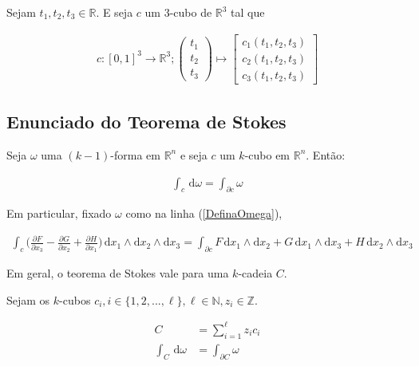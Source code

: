 \documentclass[12pt,a4paper]{article}
\begin{document}
		Sejam $t_1, t_2, t_3 \in \mathbb{R}$. E seja $c$ um 3-cubo de $\mathbb{R}^3$ tal que

		\begin{align}
			c : [0,1]^3 \rightarrow \mathbb{R}^3 ;  \begin{pmatrix} t_1 \\ t_2 \\ t_3 \end{pmatrix} \mapsto \begin{bmatrix} c_1(t_1, t_2, t_3) \\ c_2(t_1, t_2, t_3) \\ c_3(t_1, t_2, t_3) \end{bmatrix}
		\end{align}
		
	\subsection{Enunciado do Teorema de Stokes}		
		\begin{flushright}
		\end{flushright}
		
		Seja $\omega$ uma $(k-1)$-forma em $\mathbb{R}^n$ e seja $c$ um $k$-cubo em $\mathbb{R}^n$. Ent\~ao:
		
		\begin{align}
			\int_c \,\mathrm{d}\omega = \int_{\partial c} \omega
		\end{align}
		
		Em particular, fixado $\omega$ como na linha (\ref{DefinaOmega}),
		
		\begin{align}
			\int_c \biggl( \frac{\partial F}{\partial x_3} - \frac{\partial G}{\partial x_2} + \frac{\partial H}{\partial x_1} \biggl) \,\mathrm{d}x_1 \wedge\mathrm{d}x_2 \wedge\mathrm{d}x_3 = \int_{\partial c} F \,\mathrm{d}x_1 \wedge \mathrm{d}x_2 + G \,\mathrm{d}x_1 \wedge \mathrm{d}x_3 + H \,\mathrm{d}x_2 \wedge \mathrm{d}x_3 \label{Quatorze}
		\end{align}
		
		Em geral, o teorema de Stokes vale para uma $k$-cadeia $C$. 
		
		Sejam os $k$-cubos $c_i, i \in \{ 1, 2, ..., \ell \}, \ell \in \mathbb{N}, z_i \in \mathbb{Z}$.
		
		\begin{align}
			C &= \sum_{i = 1}^\ell z_i c_i \\
			\int_C \,\mathrm{d}\omega &= \int_{\partial C} \omega
		\end{align}
		
\end{document}
